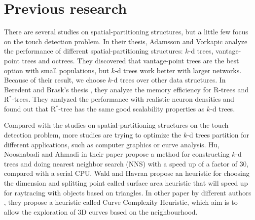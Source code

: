 \section{Previous research}
There are several studies on spatial-partitioning structures, but a little few focus on the touch detection problem. In their thesis, Adamsson and Vorkapic \cite{Adamsson_Vorkapic_2016} analyze the performance of different spatial-partitioning structures: $k$-d trees, vantage-point trees and octrees. They discovered that vantage-point trees are the best option with small populations, but $k$-d trees work better with larger networks. Because of their result, we choose $k$-d trees over other data structures. In Beredent and Brask's thesis \cite{Brask_Berendt_2020}, they analyze the memory efficiency for R-trees and R$^*$-trees. They analyzed the performance with realistic neuron densities and found out that R$^*$-tree has the same good scalability properties as $k$-d trees.

Compared with the studies on spatial-partitioning structures on the touch detection problem,  more studies are trying to optimize the $k$-d trees partition for different applications, such as computer graphics or curve analysis. Hu, Nooshabadi and Ahmadi in their paper \cite{LinjiaSaeidMajid} propose a method for constructing $k$-d trees and doing nearest neighbor search (NNS) with a speed up of a factor of 30, compared with a serial CPU. Wald and Havran \cite{WaldHavran06} propose an heuristic for choosing the dimension and splitting point called surface area heuristic that will speed up for raytracing with objects based on triangles. In other paper by different authors \cite{Yucheng}, they propose a heuristic called Curve Complexity Heuristic, which aim is to allow the exploration of 3D curves based on the neighbourhood.